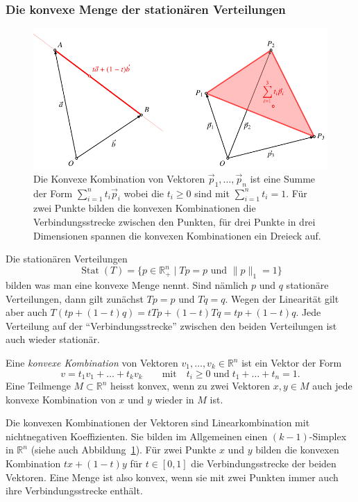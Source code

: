 \subsubsection{Die konvexe Menge der stationären Verteilungen}
\begin{figure}
\centering
\includegraphics{chapters/80-wahrscheinlichkeit/images/konvex.pdf}
\caption{Die Konvexe Kombination von Vektoren $\vec{p}_1,\dots,\vec{p}_n$ ist
eine Summe der Form $\sum_{i=1}^n t_i\vec{p}_i$ wobei die $t_i\ge 0$
sind mit $\sum_{i=1}^nt_i=1$.
Für zwei Punkte bilden die konvexen Kombinationen die Verbindungsstrecke
zwischen den Punkten, für drei Punkte in drei Dimensionen spannen die
konvexen Kombinationen ein Dreieck auf.
\label{buch:wahrscheinlichkeit:fig:konvex}}
\end{figure}
Die stationären Verteilungen
\[
\operatorname{Stat}(T)
=
\{
p\in\mathbb R_+^n \mid \text{$Tp=p $ und $\|p\|_1=1$}
\}
\]
bilden was man eine konvexe Menge nennt.
Sind nämlich $p$ und $q$ stationäre Verteilungen, dann gilt zunächst
$Tp=p$ und $Tq=q$.
Wegen der Linearität gilt aber auch $T(tp+(1-t)q)=tTp + (1-t)Tq
=tp+(1-t)q$.
Jede Verteilung auf der ``Verbindungsstrecke'' zwischen den beiden
Verteilungen ist auch wieder stationär.

\begin{definition}
Eine {\em konvexe Kombination} von Vektoren $v_1,\dots,v_k\in\mathbb{R}^n$
ist ein Vektor der Form
\[
v=t_1v_1+\dots + t_kv_k
\qquad\text{mit}\quad
t_i\ge 0\;\text{und}\;
t_1+\dots+t_n = 1.
\]
%
Eine Teilmenge $M\subset \mathbb{R}^n$ heisst konvex, wenn zu
zwei Vektoren $x,y\in M$ auch jede konvexe Kombination von $x$ und $y$
wieder in $M$ ist.
%
\end{definition}

Die konvexen Kombinationen der Vektoren sind Linearkombination
mit nichtnegativen Koeffizienten. Sie bilden im Allgemeinen
einen $(k-1)$-Simplex in $\mathbb{R}^n$ (siehe auch
Abbildung~\ref{buch:wahrscheinlichkeit:fig:konvex}).
Für zwei Punkte $x$ und $y$ bilden die konvexen Kombination
$tx+(1-t)y$ für $t\in[0,1]$ die Verbindungsstrecke der beiden
Vektoren.
Eine Menge ist also konvex, wenn sie mit zwei Punkten immer auch
ihre Verbindungsstrecke enthält.

